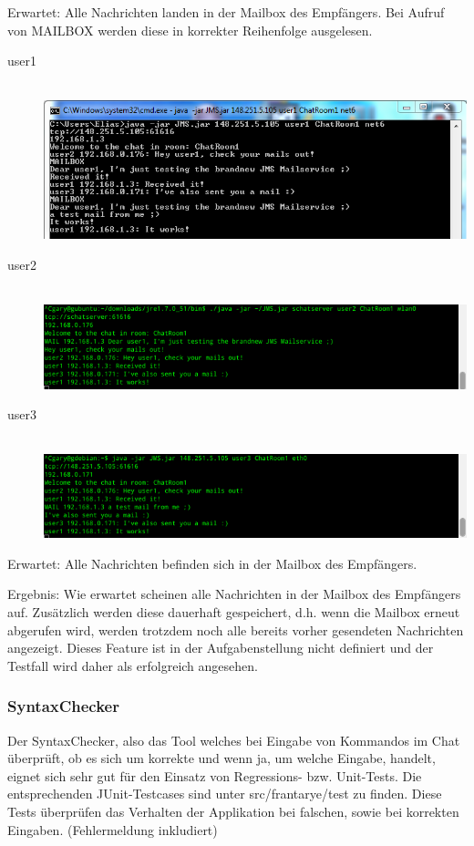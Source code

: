 \documentclass[11pt, a4paper]{article}
\begin{document}
Erwartet: Alle Nachrichten landen in der Mailbox des Empfängers. Bei Aufruf von MAILBOX werden diese in korrekter Reihenfolge ausgelesen.

\begin{center}
\begin{description}
\item[user1] \hfill \\   \includegraphics[width=6in]{pic/mail_user1.png}
\item[user2] \hfill \\   \includegraphics[width=6in]{pic/mail_user2.png}
\item[user3] \hfill \\   \includegraphics[width=6in]{pic/mail_user3.png}
\end{description}
\end{center}

Erwartet: Alle Nachrichten befinden sich in der Mailbox des Empfängers.

Ergebnis: Wie erwartet scheinen alle Nachrichten in der Mailbox des Empfängers auf. Zusätzlich werden diese dauerhaft gespeichert, d.h. wenn die Mailbox erneut
abgerufen wird, werden trotzdem noch alle bereits vorher gesendeten Nachrichten angezeigt. Dieses Feature ist in der Aufgabenstellung nicht definiert und der
Testfall wird daher als erfolgreich angesehen.

\subsubsection{SyntaxChecker}
Der SyntaxChecker, also das Tool welches bei Eingabe von Kommandos im Chat überprüft, ob es sich um korrekte und wenn ja, um welche Eingabe, handelt,
eignet sich sehr gut für den Einsatz von Regressions- bzw. Unit-Tests.
Die entsprechenden JUnit-Testcases sind unter src/frantarye/test zu finden.
Diese Tests überprüfen das Verhalten der Applikation bei falschen, sowie bei korrekten Eingaben. (Fehlermeldung inkludiert)
\end{document}

